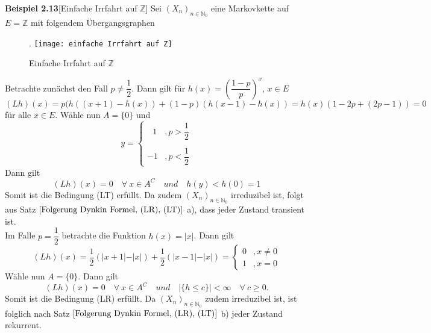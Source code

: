 \textbf{Beispiel 2.13}[Einfache Irrfahrt auf $\mathbb{Z}$] Sei $(X_{n})_{n \in \mathbb{N}_{0}}$ eine Markovkette auf $E = \mathbb{Z}$ mit folgendem Übergangsgraphen
\begin{figure}[H].
\centering
\texttt{[image: einfache Irrfahrt auf Z]}
\caption{Einfache Irrfahrt auf $\mathbb{Z}$}
\end{figure}
\noindent
Betrachte zunächst den Fall $p \neq \dfrac{1}{2}$. Dann gilt für $h(x) = {\left(\dfrac{1-p}{p} \right)}^{x}$, $x \in E$
\begin{equation*}
(Lh)(x) = p(h((x+1)-h(x)) + (1-p)(h(x-1)-h(x)) = h(x)(1-2p+(2p-1)) = 0
\end{equation*}
für alle $x \in E$. Wähle nun $A = \lbrace 0 \rbrace$ und 
\begin{equation*}
y =
\begin{cases}
\: \: \:1 & , p > \dfrac{1}{2}\\
& \\
-1 & , p < \dfrac{1}{2}
\end{cases}
\end{equation*}
Dann gilt 
\begin{equation*}
(Lh)(x) = 0 \quad \forall \: x \in A^{C} \quad und \quad h(y) < h(0) = 1
\end{equation*}
Somit ist die Bedingung (LT) erfüllt. Da zudem $(X_{n})_{n \in \mathbb{N}_{0}}$ irreduzibel ist, folgt aus Satz $\ref{Folgerung Dynkin Formel, (LR), (LT)}$ a), dass jeder Zustand transient ist.
\\
Im Falle $p = \dfrac{1}{2}$ betrachte die Funktion $h(x) = \vert x \vert$. Dann gilt
\begin{equation*}
(Lh)(x) = \dfrac{1}{2} (\vert x +1 \vert - \vert x \vert) + \dfrac{1}{2}(\vert x -1 \vert - \vert x \vert) =
\begin{cases}
0 & , x \neq 0\\

1 & , x = 0
\end{cases}
\end{equation*}
Wähle nun $A = \lbrace 0 \rbrace$. Dann gilt
\begin{equation*}
(Lh)(x) = 0 \quad \forall \: x \in A^{C} \quad und \quad \vert \lbrace h \leq c\rbrace \vert < \infty \quad \forall \: c \geq 0.
\end{equation*}
Somit ist die Bedingung (LR) erfüllt. Da $(X_{n})_{n \in \mathbb{N}_{0}}$ zudem irreduzibel ist, ist folglich nach Satz $\ref{Folgerung Dynkin Formel, (LR), (LT)}$ b) jeder Zustand rekurrent.

